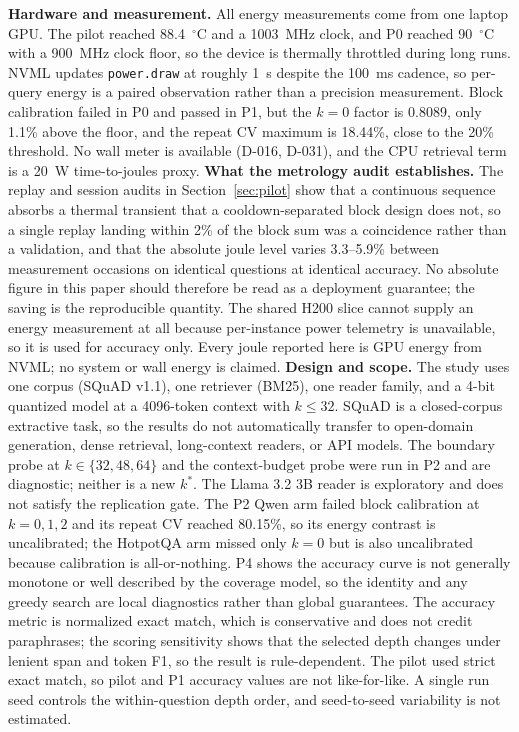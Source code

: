 \documentclass[a4paper,fleqn]{cas-sc}
\begin{document}
\textbf{Hardware and measurement.} All energy measurements come from one laptop GPU. The pilot reached 88.4~$^{\circ}$C and a 1003~MHz clock, and P0 reached 90~$^{\circ}$C with a 900~MHz clock floor, so the device is thermally throttled during long runs. NVML updates \texttt{power.draw} at roughly 1~s despite the 100~ms cadence, so per-query energy is a paired observation rather than a precision measurement. Block calibration failed in P0 and passed in P1, but the $k=0$ factor is 0.8089, only 1.1\% above the floor, and the repeat CV maximum is 18.44\%, close to the 20\% threshold. No wall meter is available (D-016, D-031), and the CPU retrieval term is a 20~W time-to-joules proxy. \textbf{What the metrology audit establishes.} The replay and session audits in Section~\ref{sec:pilot} show that a continuous sequence absorbs a thermal transient that a cooldown-separated block design does not, so a single replay landing within 2\% of the block sum was a coincidence rather than a validation, and that the absolute joule level varies 3.3--5.9\% between measurement occasions on identical questions at identical accuracy. No absolute figure in this paper should therefore be read as a deployment guarantee; the saving is the reproducible quantity. The shared H200 slice cannot supply an energy measurement at all because per-instance power telemetry is unavailable, so it is used for accuracy only. Every joule reported here is GPU energy from NVML; no system or wall energy is claimed. \textbf{Design and scope.} The study uses one corpus (SQuAD v1.1), one retriever (BM25), one reader family, and a 4-bit quantized model at a 4096-token context with $k\le32$. SQuAD is a closed-corpus extractive task, so the results do not automatically transfer to open-domain generation, dense retrieval, long-context readers, or API models. The boundary probe at $k\in\{32,48,64\}$ and the context-budget probe were run in P2 and are diagnostic; neither is a new $k^{*}$. The Llama 3.2 3B reader is exploratory and does not satisfy the replication gate. The P2 Qwen arm failed block calibration at $k=0,1,2$ and its repeat CV reached 80.15\%, so its energy contrast is uncalibrated; the HotpotQA arm missed only $k=0$ but is also uncalibrated because calibration is all-or-nothing. P4 shows the accuracy curve is not generally monotone or well described by the coverage model, so the identity and any greedy search are local diagnostics rather than global guarantees. The accuracy metric is normalized exact match, which is conservative and does not credit paraphrases; the scoring sensitivity shows that the selected depth changes under lenient span and token F1, so the result is rule-dependent. The pilot used strict exact match, so pilot and P1 accuracy values are not like-for-like. A single run seed controls the within-question depth order, and seed-to-seed variability is not estimated.
\end{document}
